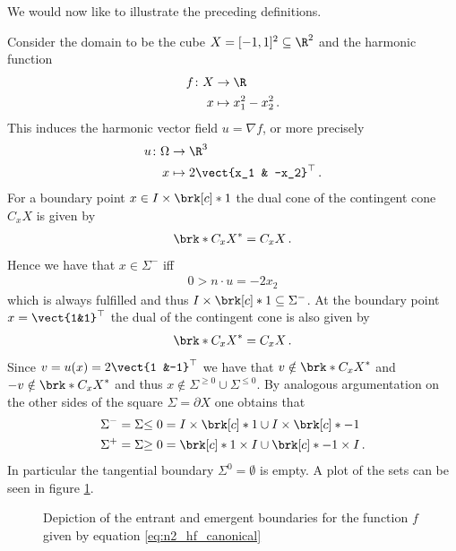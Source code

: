 We would now like to illustrate the preceding definitions.
\begin{example}\label{ex:n2_hvf_canonical}
  Consider the domain to be the cube $X=[-1,1]^2\subseteq\R^2$
  and the harmonic function
  \begin{equation}
    \begin{aligned}
    f\colon X&\to\R \\
    x&\mapsto x_1^2-x_2^2\,.\label{eq:n2_hf_canonical}
    \end{aligned}
  \end{equation}
  This induces the harmonic vector field $u=\nabla f$, or more precisely
  \begin{equation}
    \begin{aligned}
    u\colon \Omega&\to\R^3 \\
    x&\mapsto 2\vect{x_1 & -x_2}^\top\,.\label{eq:n2_hvf_canonical}
    \end{aligned}
  \end{equation}
  For a boundary point $x\in I\times\brk[c]*{1}$ the dual cone of the contingent cone
  $C_xX$ is given by
  \begin{align*}
    \brk*{C_xX}^*=C_xX\,.
  \end{align*}
  Hence we have that $x\in\Sigma^-$ iff
  \begin{align*}
    0>n\cdot u = -2x_2
  \end{align*}
  which is always fulfilled and thus $I\times\brk[c]*{1}\subseteq\Sigma^-$.
  At the boundary point $x=\vect{1&1}^\top$ the dual of the contingent cone is also given by
  \begin{align*}
    \brk*{C_xX}^*=C_xX\,.
  \end{align*}
  Since $v=u(x)=2\vect{1 &-1}^\top$ we have that $v\notin\brk*{C_xX}^*$ and $-v\notin\brk*{C_xX}^*$
  and thus $x\notin\Sigma^{\geq0}\cup\Sigma^{\leq0}$.
  By analogous argumentation on the other sides of the square $\Sigma=\partial X$
  one obtains that
  \begin{align*}
    \Sigma^-=\Sigma{\leq0}&=I\times\brk[c]*{1}\cup I\times\brk[c]*{-1}\\
    \Sigma^+=\Sigma{\geq0}&=\brk[c]*{1}\times I\cup \brk[c]*{-1}\times I\,.
  \end{align*}
  In particular the tangential boundary $\Sigma^{0}=\emptyset$ is empty.
  A plot of the sets can be seen in figure \ref{pl:n2_hvf_canonical_boundary}.
  \begin{figure}
    \centering
    
    \caption{Depiction of the entrant and emergent boundaries for the
      function $f$ given by equation \eqref{eq:n2_hf_canonical}}
    \label{pl:n2_hvf_canonical_boundary}
  \end{figure}
\end{example}

